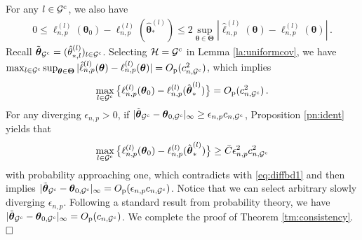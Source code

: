 \documentclass[12pt]{article}
\newcommand{\bTheta}{\boldsymbol \Theta}
\newcommand{\btheta}{\boldsymbol \theta}
\def\T{{\scriptscriptstyle \top} }
\newcommand{\btc}{{\rm c}}
\newcommand{\0}{{\bf 0}}
\begin{document}
For any $l\in\mathcal{G}^{\btc}$, %
we also have 
\begin{align*}%
0\leq {\ell}_{n,p}^{(l)}(\btheta_0)-{\ell}_{n,p}^{(l)}(\hat{\btheta}_*^{(l)})\leq 2\sup_{\btheta\in\bTheta}|\hat{\ell}_{n,p}^{(l)}(\btheta)-{\ell}_{n,p}^{(l)}(\btheta)|\,.
\end{align*}
Recall $\tilde{\btheta}_{\mathcal{G}^{\btc}}=(\hat{\theta}_{*,l}^{(l)})_{l\in\mathcal{G}^{\btc}}$. Selecting $\mathcal{H}=\mathcal{G}^{\btc}$ in Lemma \ref{la:uniformcov}, we have $\max_{l\in\mathcal{G}^{\btc}}\sup_{\btheta\in\bTheta}|\hat{\ell}_{n,p}^{(l)}(\btheta)-{\ell}_{n,p}^{(l)}(\btheta)|=O_{\rm p}(c_{n,\mathcal{G}^{\btc}}^2)$, which implies 
\begin{align}\label{eq:diffbd1}
\max_{l\in\mathcal{G}^{\btc}}\big\{{\ell}_{n,p}^{(l)}(\btheta_0)-{\ell}_{n,p}^{(l)}(\hat{\btheta}_*^{(l)})\big\}=O_{\rm p}(c_{n,\mathcal{G}^{\btc}}^2)\,.
\end{align}
For any diverging $\epsilon_{n,p}>0$, if $|\tilde{\btheta}_{\mathcal{G}^{\btc}}-\btheta_{0,\mathcal{G}^{\btc}}|_\infty\geq \epsilon_{n,p}c_{n,\mathcal{G}^{\btc}}$, Proposition \ref{pn:ident} yields that
\[
\max_{l\in\mathcal{G}^{\btc}}\big\{{\ell}_{n,p}^{(l)}(\btheta_0)-{\ell}_{n,p}^{(l)}(\hat{\btheta}_*^{(l)})\big\}\geq\bar{C}\epsilon_{n,p}^2c_{n,\mathcal{G}^{\btc}}^2 
\]
with probability approaching one, which contradicts with \eqref{eq:diffbd1} and then implies $|\tilde{\btheta}_{\mathcal{G}^{\btc}}-\btheta_{0,\mathcal{G}^{\btc}}|_\infty=O_{\rm p}( \epsilon_{n,p}c_{n,\mathcal{G}^{\btc}})$. Notice that we can select arbitrary slowly diverging $\epsilon_{n,p}$. Following a standard result from
probability theory, we have $|\tilde{\btheta}_{\mathcal{G}^{\btc}}-\btheta_{0,\mathcal{G}^{\btc}}|_\infty=O_{\rm p}(c_{n,\mathcal{G}^{\btc}})$. We complete the proof of Theorem \ref{tm:consistency}.  $\hfill\Box$
\end{document}
